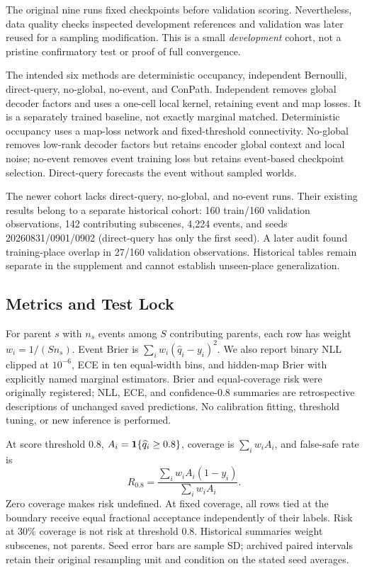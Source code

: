 \documentclass[conference,letterpaper,10pt]{IEEEtran}
\begin{document}
The original nine runs fixed checkpoints before validation scoring. Nevertheless, data quality checks inspected development references and validation was later reused for a sampling modification. This is a small \emph{development} cohort, not a pristine confirmatory test or proof of full convergence.

The intended six methods are deterministic occupancy, independent Bernoulli, direct-query, no-global, no-event, and ConPath. Independent removes global decoder factors and uses a one-cell local kernel, retaining event and map losses. It is a separately trained baseline, not exactly marginal matched. Deterministic occupancy uses a map-loss network and fixed-threshold connectivity. No-global removes low-rank decoder factors but retains encoder global context and local noise; no-event removes event training loss but retains event-based checkpoint selection. Direct-query forecasts the event without sampled worlds.

The newer cohort lacks direct-query, no-global, and no-event runs. Their existing results belong to a separate historical cohort: 160 train/160 validation observations, 142 contributing subscenes, 4,224 events, and seeds 20260831/0901/0902 (direct-query has only the first seed). A later audit found training-place overlap in 27/160 validation observations. Historical tables remain separate in the supplement and cannot establish unseen-place generalization.

\subsection{Metrics and Test Lock}
For parent $s$ with $n_s$ events among $S$ contributing parents, each row has weight $w_i=1/(Sn_s)$. Event Brier is $\sum_iw_i(\widehat q_i-y_i)^2$. We also report binary NLL clipped at $10^{-6}$, ECE in ten equal-width bins, and hidden-map Brier with explicitly named marginal estimators. Brier and equal-coverage risk were originally registered; NLL, ECE, and confidence-0.8 summaries are retrospective descriptions of unchanged saved predictions. No calibration fitting, threshold tuning, or new inference is performed.

At score threshold 0.8, $A_i=\mathbf{1}\{\widehat q_i\geq0.8\}$, coverage is $\sum_iw_iA_i$, and false-safe rate is
\begin{equation}
 R_{0.8}=\frac{\sum_iw_iA_i(1-y_i)}{\sum_iw_iA_i}.
\end{equation}
Zero coverage makes risk undefined. At fixed coverage, all rows tied at the boundary receive equal fractional acceptance independently of their labels. Risk at 30\% coverage is not risk at threshold 0.8. Historical summaries weight subscenes, not parents. Seed error bars are sample SD; archived paired intervals retain their original resampling unit and condition on the stated seed averages.
\end{document}
